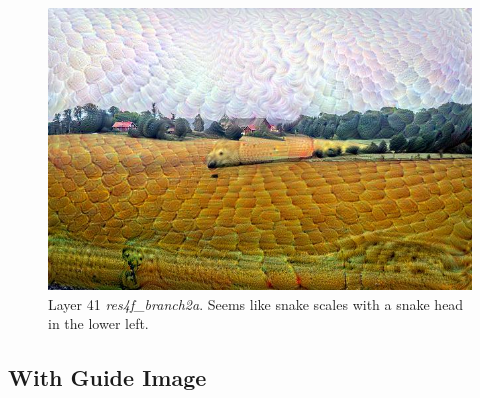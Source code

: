 \begin{figure}[H]
	\centering
	\includegraphics[width=0.5\linewidth]{img/alpsted-landscape_res4f_branch2a.jpg}
	\caption{Layer 41 \emph{res4f\_branch2a}. Seems like snake scales with a snake head in the lower left.}
	\label{fig:layer-snake}
\end{figure}


\subsection{With Guide Image}
\label{sec:withguide}
